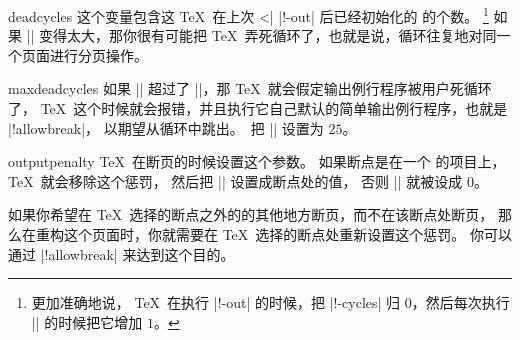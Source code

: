 \begindesc
\cts deadcycles {}
\explain
这个变量包含这 \TeX\ 在上次 ^^|\shipout| |\ship!-out| 后已经初始化的  的个数。
\footnote{更加准确地说， \TeX\ 在执行 |\ship!-out| 的时候，把 |\dead!-cycles| 归 $0$，然后每次执行 |\output| 的时候把它增加 $1$。}
如果 |\deadcycles| 变得太大，那你很有可能把 \TeX\ 弄死循环了，也就是说，循环往复地对同一个页面进行分页操作。
\enddesc



\begindesc
\cts maxdeadcycles {}
\explain
如果 |\deadcycles| 超过了 |\maxdeadcycles|，那 \TeX\ 就会假定输出例行程序被用户死循环了，
\TeX\ 这个时候就会报错，并且执行它自己默认的简单输出例行程序，也就是 |\shipout!allowbreak|，
以期望从循环中跳出。\PlainTeX\ 把 |\maxdeadcycles| 设置为 \hbox{$25$}。
\enddesc

%

\begindesc
\cts outputpenalty {}
\explain
\TeX\ 在断页的时候设置这个参数。
如果断点是在一个  的项目上，\TeX\ 就会移除这个惩罚，
然后把 |\outputpenalty| 设置成断点处的值， 否则 |\outputpenalty| 就被设成 \hbox{$0$}。

如果你希望在 \TeX\ 选择的断点之外的的其他地方断页，而不在该断点处断页，
那么在重构这个页面时，你就需要在 \TeX\ 选择的断点处重新设置这个惩罚。
你可以通过 |\penalty!allowbreak\outputpenalty| 来达到这个目的。
\enddesc


%

